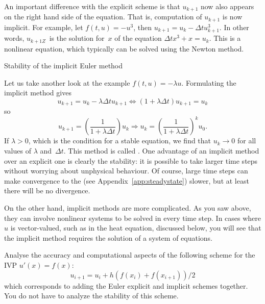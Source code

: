An important difference with the explicit scheme is that $u_{k+1}$ now
also appears on the right hand side of the equation. That is,
computation of $u_{k+1}$ is now implicit.
For example, let $f(t,u)=-u^3$, then $u_{k+1}=u_k-\Delta t
u_{k+1}^3$. In other words, $u_{k+1Z}$~is the solution for~$x$ of the
equation $\Delta t x^3+x=u_k$. This is a nonlinear equation, which
typically can be solved using the Newton method.

 {Stability of the implicit Euler method}

Let us take another look at the example $f(t,u)=-\lambda
u$. Formulating the implicit method gives
\[    u_{k+1}=u_k-\lambda \Delta t u_{k+1} \Leftrightarrow
    (1+\lambda\Delta t)u_{k+1}=u_k
\]
so
\[
    u_{k+1}=\left (\frac1{1+\lambda\Delta t}\right)u_k \Rightarrow
    u_k=\left (\frac1{1+\lambda\Delta t}\right)^ku_0.
\]
If $\lambda>0$, which is the condition for a stable equation, we find
that $u_k\rightarrow0$ for all values of $\lambda$ and~$\Delta
t$. This method is called .  One
advantage of an implicit method over an explicit one is clearly
the stability: it is possible to take larger time steps without
worrying about unphysical behaviour. Of course, large time steps can
make convergence to the  (see
Appendix~\ref{app:steadystate}) slower, but at least there will be no
divergence.

On the other hand, implicit methods are more complicated. As you saw
above, they can involve nonlinear systems to be solved in every time step. 
In cases where $u$ is vector-valued, such as in the heat equation,
discussed below, you will see 
that the implicit method requires the solution of a system of
equations.

\begin{exercise}
  Analyse the accuracy and computational aspects of the following
scheme for the IVP $u'(x)=f(x)$:
\[ u_{i+1}=u_i+h(f(x_i)+f(x_{i+1}))/2 \] which corresponds to adding
the Euler explicit and implicit schemes together. You do not have
to analyze the stability of this scheme.
\end{exercise}

